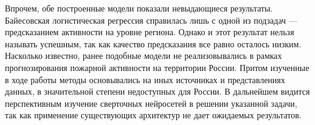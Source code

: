 \documentclass[a4paper,article,14pt]{extarticle}
\begin{document}
Впрочем, обе построенные модели показали невыдающиеся результаты. Байесовская логистическая регрессия справилась лишь с одной из подзадач — предсказанием активности на уровне региона. Однако и этот результат нельзя называть успешным, так как качество предсказания все равно осталось низким. Насколько известно, ранее подобные модели не реализовывались в рамках прогнозирования пожарной активности на территории России. Притом  изученные в ходе работы методы основывались на иных источниках и представлениях данных, в значительной степени недоступных для России. В дальнейшем видится перспективным изучение сверточных нейросетей в решении указанной задачи, так как применение существующих архитектур не дает ожидаемых результатов.

\pagebreak


\end{document}
